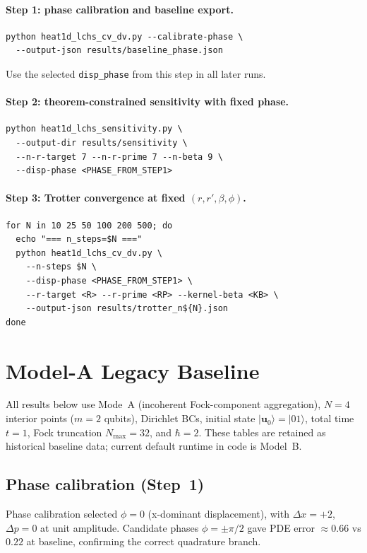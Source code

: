 \documentclass[11pt]{article}
\begin{document}
\paragraph{Step 1: phase calibration and baseline export.}
\begin{verbatim}
python heat1d_lchs_cv_dv.py --calibrate-phase \
  --output-json results/baseline_phase.json
\end{verbatim}
Use the selected \texttt{disp\_phase} from this step in all later runs.

\paragraph{Step 2: theorem-constrained sensitivity with fixed phase.}
\begin{verbatim}
python heat1d_lchs_sensitivity.py \
  --output-dir results/sensitivity \
  --n-r-target 7 --n-r-prime 7 --n-beta 9 \
  --disp-phase <PHASE_FROM_STEP1>
\end{verbatim}

\paragraph{Step 3: Trotter convergence at fixed \((r,r',\beta,\phi)\).}
\begin{verbatim}
for N in 10 25 50 100 200 500; do
  echo "=== n_steps=$N ==="
  python heat1d_lchs_cv_dv.py \
    --n-steps $N \
    --disp-phase <PHASE_FROM_STEP1> \
    --r-target <R> --r-prime <RP> --kernel-beta <KB> \
    --output-json results/trotter_n${N}.json
done
\end{verbatim}

\appendix
\section{Model-A Legacy Baseline}
\label{sec:results}

All results below use Mode~A (incoherent Fock-component aggregation),
$N=4$ interior points ($m=2$ qubits), Dirichlet BCs,
initial state $|\mathbf u_0\rangle=|01\rangle$, total time $t=1$,
Fock truncation $N_{\max}=32$, and $\hbar=2$.
These tables are retained as historical baseline data; current default runtime in code is Model~B.

\subsection{Phase calibration (Step~1)}
Phase calibration selected $\phi=0$ (x-dominant displacement),
with $\Delta x=+2$, $\Delta p=0$ at unit amplitude.
Candidate phases $\phi=\pm\pi/2$ gave PDE error $\approx 0.66$ vs $0.22$ at baseline,
confirming the correct quadrature branch.
\end{document}

